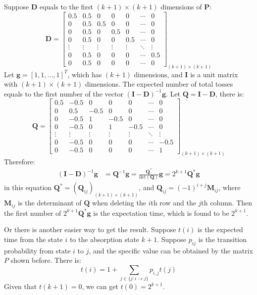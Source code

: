\documentclass[12pt]{article}
\begin{document}
Suppose $\bm{D}$ equals to the first $(k+1)\times(k+1)$ dimensions of $\bm{P}$:
\begin{equation*}
\bm{D}=\left[ \begin{array}{ccccccc}
0.5 & 0.5 & 0 & 0 & 0 & \cdots & 0\\
0 & 0.5 & 0.5 & 0 & 0 & \cdots & 0\\
0 & 0.5 & 0 & 0.5 & 0 & \cdots & 0\\
0 & 0.5 & 0  & 0 & 0.5 & \cdots & 0\\
\vdots & \vdots & \vdots & \vdots & \vdots & \ddots & \vdots \\
0 & 0.5 & 0  & 0 & 0 & \cdots & 0.5\\
0 & 0.5 & 0  & 0 & 0 & \cdots & 0
\end{array} 
\right]_{(k+1)\times(k+1)}
\end{equation*}
Let $\bm{g}=[1,1,...,1]^T$, which has $(k+1)$ dimensions, and $\bm{I}$ is a unit matrix with $(k+1)\times(k+1)$ dimensions. The expected number of total tosses equals to the first number of the vector $(\bm{I}-\bm{D})^{-1}\bm{g}$. Let $\bm{Q}=\bm{I}-\bm{D}$, there is:
\begin{equation*}
\bm{Q}=\left[ \begin{array}{ccccccc}
0.5 & -0.5 & 0 & 0 & 0 & \cdots & 0\\
0 & 0.5 & -0.5 & 0 & 0 & \cdots & 0\\
0 & -0.5 & 1 & -0.5 & 0 & \cdots & 0\\
0 & -0.5 & 0  & 1 & -0.5 & \cdots & 0\\
\vdots & \vdots & \vdots & \vdots & \vdots & \ddots & \vdots \\
0 & -0.5 & 0  & 0 & 0 & \cdots & -0.5\\
0 & -0.5 & 0  & 0 & 0 & \cdots & 1
\end{array} 
\right]_{(k+1)\times(k+1)}
\end{equation*}
Therefore:
\begin{align*}
(\bm{I}-\bm{D})^{-1}\bm{g}&=\bm{Q}^{-1}\bm{g}=\frac{\bm{Q}^*}{\mathrm{det}\left(\bm{Q}\right)}\bm{g}=2^{k+1}\bm{Q}^*\bm{g}
\end{align*}
in this equation $\bm{Q}^*=\left(\bm{Q}_{ij}\right)_{(k+1)\times(k+1)}$, and $\bm{Q}_{ij}=(-1)^{i+j}\bm{M}_{ij}$, where $\bm{M}_{ij}$ is the determinant of $\bm{Q}$ when deleting the $i$th row and the $j$th column. Then the first number of $2^{k+1}\bm{Q}^*\bm{g}$ is the expectation time, which is found to be $2^{k+1}$.
\par
Or there is another easier way to get the result. Suppose $t(i)$ is the expected time from the state $i$ to the absorption state $k+1$. Suppose $p_{ij}$ is the transition probability from state $i$ to $j$, and the specific value can be obtained by the matrix $P$ shown before. There is:
$$t(i)=1+\sum_{j\in\{j:i\rightarrow j\}}p_{i,j}t(j)$$
Given that $t(k+1)=0$, we can get $t(0)=2^{k+1}$.
\end{document}

